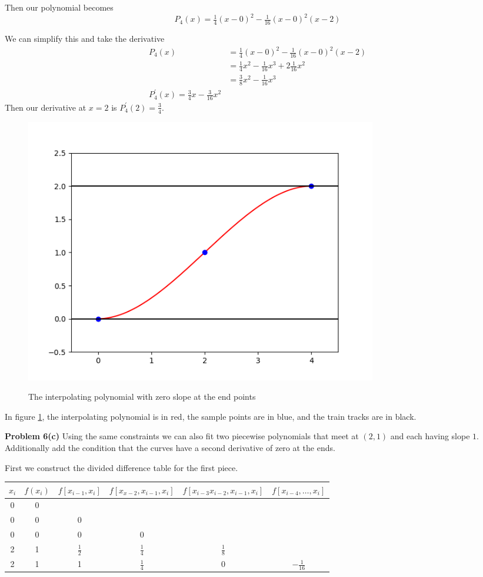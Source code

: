 \documentclass[12pt]{article}
\newcommand{\problem}[1]{\hspace{-4 ex} \large \textbf{Problem #1} }
\begin{document}
	Then our polynomial becomes
	$$
	P_4(x) = \tfrac{1}{4}(x-0)^2 - \tfrac{1}{16}(x-0)^2(x-2)
	$$
	
	We can simplify this and take the derivative
	\begin{align*}
		P_4(x) & = \tfrac{1}{4}(x-0)^2 - \tfrac{1}{16}(x-0)^2(x-2) \\
		& = \tfrac{1}{4}x^2 - \tfrac{1}{16}x^3 + 2\tfrac{1}{16}x^2 \\
		& = \tfrac{3}{8}x^2 - \tfrac{1}{16}x^3\\
		P_4^\prime(x) = \tfrac{3}{4}x - \tfrac{3}{16}x^2
	\end{align*}
	Then our derivative at $x=2$ is $P_4^\prime(2) = \tfrac{3}{4}$.

	\begin{figure}[H]
		\caption{The interpolating polynomial with zero slope at the end points}
		\includegraphics[width=0.75\textwidth]{hw4_figure_6}
		\centering
		\label{fig:p5b}
	\end{figure}
	In figure \ref{fig:p5b}, the interpolating polynomial is in red, the sample points are in blue, and the train tracks are in black. \bigbreak
	
\problem{6(c)} Using the same constraints we can also fit two piecewise polynomials that meet at $(2,1)$ and each having slope $1$. Additionally add the condition that the curves have a second derivative of zero at the ends.

	First we construct the divided difference table for the first piece.
	\begin{center}
		\begin{tabular}{|c|c|c|c|c|c|}\hline
			$x_i$ & $f(x_i)$ & $f[x_{i-1},x_i]$ & $f[x_{x-2}, x_{i-1}, x_i]$ & $f[ x_{i-3}x_{i-2}, x_{i-1}, x_i]$ & $f[ x_{i-4},\dots, x_i]$ \\ \hline
			0 & 0 & & & & \\ \hline
			0 & 0 & 0 & & & \\ \hline
			0 & 0 & 0 & 0 & & \\ \hline
			2 & 1 & $\tfrac{1}{2}$ & $\tfrac{1}{4}$ & $\tfrac{1}{8}$ & \\ \hline
			2 & 1 & 1 &  $\tfrac{1}{4}$ & 0 & $-\tfrac{1}{16}$ \\ \hline
		\end{tabular}
	\end{center}
	
\end{document}
